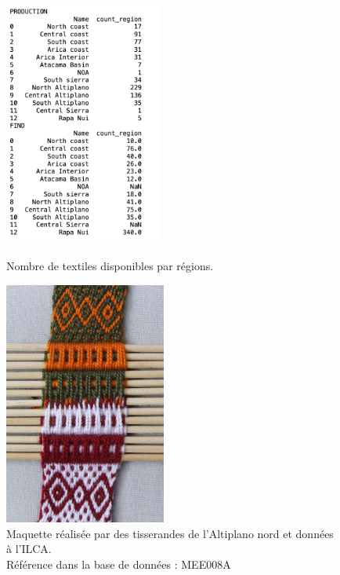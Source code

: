 \clearpage

\begin{figure}[!h]
    \begin{minipage}[c]{.5\linewidth}
            \begin{center}
                \includegraphics[height=8cm]{../images/count_region.png}
            \end{center}
            \caption{Nombre de textiles disponibles par régions.}
            \label{fig:tab_region_count}   
    \end{minipage}
\hspace{5pt}
        \begin{minipage}[c]{.5\linewidth}
        \begin{center}
        		\includegraphics[height=8cm]{../images/MEE008A_IMG_7128.jpg}
	\end{center}
	\caption{Maquette réalisée par des tisserandes de l'Altiplano nord et données à l'ILCA. \\ Référence dans la base de données : MEE008A}
	\label{fig:maquette}   
    \end{minipage}
\end{figure}

